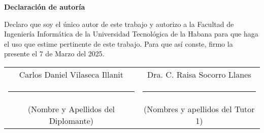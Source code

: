 {\Large \textbf{Declaración de autoría} \vspace{.3cm}}

Declaro que soy el único autor de este trabajo y autorizo a la Facultad de Ingeniería Informática de la Universidad Tecnológica de la Habana para que haga el uso que estime pertinente de este trabajo. Para que así conste, firmo la presente el 7 de Marzo del 2025.

\vspace{3cm}

\begingroup	

\setlength{\tabcolsep}{10pt} %
\renewcommand{\arraystretch}{0.5} %
\centering
\begin{tabular}{c c}
	
	Carlos Daniel Vilaseca Illanit  & Dra. C. Raisa Socorro Llanes \\
	\noindent\rule{6cm}{0.4pt} & \noindent\rule{6cm}{0.4pt} \\
	(Nombre y Apellidos del Diplomante) &  	(Nombres y apellidos del Tutor 1)	
\end{tabular}
\vspace{3cm}

\endgroup

